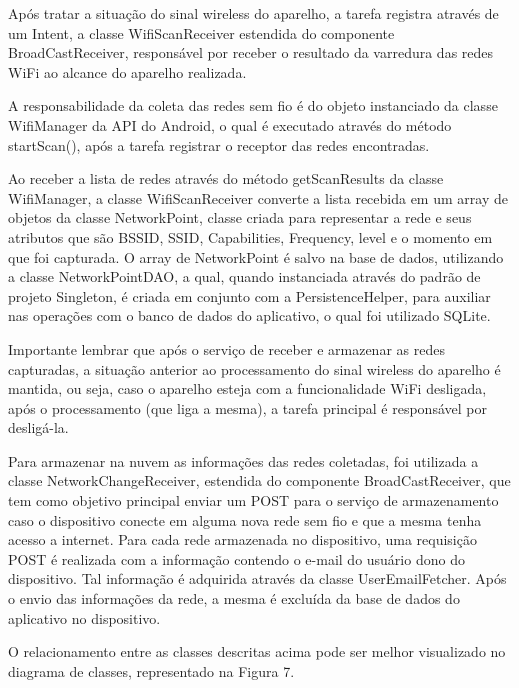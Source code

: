 \documentclass[12pt, %
openright, 
oneside,
a4paper,
brazil]{facom-ufu-abntex2}
\begin{document}
  Após tratar a situação do sinal wireless do aparelho, a tarefa registra através de um Intent, a classe WifiScanReceiver estendida do componente BroadCastReceiver, responsável por receber o resultado da varredura das redes \ac{WiFi} ao alcance do aparelho realizada.
 
 A responsabilidade da coleta das redes sem fio é do objeto instanciado da classe WifiManager da \ac{API} do Android, o qual é executado através do método startScan(), após a tarefa registrar o receptor das redes encontradas.
 
  Ao receber a lista de redes através do método getScanResults da classe WifiManager, a classe WifiScanReceiver converte a lista recebida em um array de objetos da classe NetworkPoint, classe criada para representar a rede e seus atributos que são \ac{BSSID}, \ac{SSID}, Capabilities, Frequency, level e o momento em que foi capturada. O array de NetworkPoint é salvo na base de dados, utilizando a classe NetworkPointDAO, a qual, quando instanciada através do padrão de projeto Singleton, é criada em conjunto com a PersistenceHelper, para auxiliar nas operações com o banco de dados do aplicativo, o qual foi utilizado SQLite.
 
 Importante lembrar que após o serviço de receber e armazenar as redes capturadas, a situação anterior ao processamento do sinal wireless do aparelho é mantida, ou seja, caso o aparelho esteja com a funcionalidade \ac{WiFi} desligada, após o processamento (que liga a mesma), a tarefa principal é responsável por desligá-la. 
 
  Para armazenar na nuvem as informações das redes coletadas, foi utilizada a classe NetworkChangeReceiver, estendida do componente BroadCastReceiver, que tem como objetivo principal enviar um POST para o serviço de armazenamento caso o dispositivo conecte em alguma nova rede sem fio e que a mesma tenha acesso a internet. Para cada rede armazenada no dispositivo, uma requisição POST é realizada com a informação contendo o e-mail do usuário dono do dispositivo. Tal informação é adquirida através da classe UserEmailFetcher. Após o envio das informações da rede, a mesma é excluída da base de dados do aplicativo no dispositivo.

  O relacionamento entre as classes descritas acima pode ser melhor visualizado no diagrama de classes, representado na Figura 7.    
  
\end{document}
